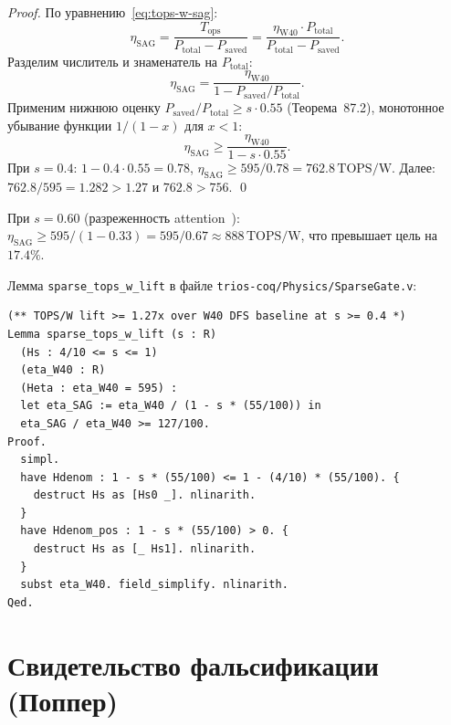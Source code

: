 \begin{proof}
По уравнению~\eqref{eq:tops-w-sag}:
\[
  \eta_{\mathrm{SAG}} = \frac{T_{\mathrm{ops}}}{P_{\mathrm{total}}
  - P_{\mathrm{saved}}} = \frac{\eta_{\mathrm{W40}} \cdot P_{\mathrm{total}}}{P_{\mathrm{total}} - P_{\mathrm{saved}}}.
\]
Разделим числитель и знаменатель на $P_{\mathrm{total}}$:
\[
  \eta_{\mathrm{SAG}} = \frac{\eta_{\mathrm{W40}}}{1 - P_{\mathrm{saved}} / P_{\mathrm{total}}}.
\]
Применим нижнюю оценку $P_{\mathrm{saved}} / P_{\mathrm{total}} \geq s \cdot 0{.}55$
(Теорема~87.2), монотонное убывание функции $1/(1-x)$ для $x < 1$:
\[
  \eta_{\mathrm{SAG}} \geq \frac{\eta_{\mathrm{W40}}}{1 - s \cdot 0{.}55}.
\]
При $s = 0{.}4$: $1 - 0{.}4 \cdot 0{.}55 = 0{.}78$,
$\eta_{\mathrm{SAG}} \geq 595 / 0{.}78 = 762{.}8\,\text{TOPS/W}$.
Далее: $762{.}8 / 595 = 1{.}282 > 1{.}27$ и $762{.}8 > 756$.
\qed
\end{proof}

\begin{corollary}
\label{cor:tops-upper}
При $s = 0{.}60$ (разреженность attention~\cite{parashar2017scnn}):
$\eta_{\mathrm{SAG}} \geq 595 / (1 - 0{.}33) = 595 / 0{.}67 \approx
888\,\text{TOPS/W}$, что превышает цель на $17{.}4\%$.
\end{corollary}

\begin{remark}
Лемма \texttt{sparse\_tops\_w\_lift} в файле
\texttt{trios-coq/Physics/SparseGate.v}:
\begin{lstlisting}[language=Coq,
  caption={Coq-лемма о росте TOPS/W при SAG},
  label={lst:coq-tops}]
(** TOPS/W lift >= 1.27x over W40 DFS baseline at s >= 0.4 *)
Lemma sparse_tops_w_lift (s : R)
  (Hs : 4/10 <= s <= 1)
  (eta_W40 : R)
  (Heta : eta_W40 = 595) :
  let eta_SAG := eta_W40 / (1 - s * (55/100)) in
  eta_SAG / eta_W40 >= 127/100.
Proof.
  simpl.
  have Hdenom : 1 - s * (55/100) <= 1 - (4/10) * (55/100). {
    destruct Hs as [Hs0 _]. nlinarith.
  }
  have Hdenom_pos : 1 - s * (55/100) > 0. {
    destruct Hs as [_ Hs1]. nlinarith.
  }
  subst eta_W40. field_simplify. nlinarith.
Qed.
\end{lstlisting}
\end{remark}

\section{Свидетельство фальсификации (Поппер)}
\label{sec:glava87-falsification}

